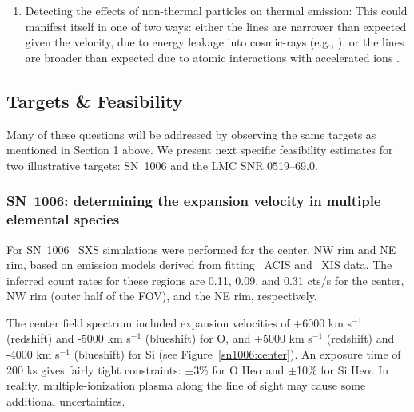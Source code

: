 \documentclass[11pt,a4paper]{article}
\begin{document}
{\begin{enumerate}
\item Detecting the effects of non-thermal particles on thermal
  emission: This could manifest itself in one of two ways: either the
  lines are narrower than expected given the velocity, due to energy
  leakage into cosmic-rays (e.g., \citealt{hughes00a, helder09}), or
  the lines are broader than expected due to atomic interactions with
  accelerated ions \citep{tatischeff98}.

\end{enumerate}


\subsection{Targets \& Feasibility}

Many of these questions will be addressed by observing
the same targets as mentioned in Section 1 above.
We present next specific feasibility estimates for two illustrative targets:
SN~1006 and the LMC SNR 0519--69.0. 

\subsubsection{SN~1006: determining the expansion velocity in multiple
elemental species} \label{subsec:sn1006}


For SN~1006 \ah\ SXS simulations were performed for the center, NW rim
and NE rim, based on emission models derived from fitting
\chandra\ ACIS and \suzaku\ XIS data.  The inferred count rates for
these regions are 0.11, 0.09, and 0.31 cts/s for the center, NW rim
(outer half of the FOV), and the NE rim, respectively.

The center field spectrum included expansion velocities of +6000 km
s$^{-1}$ (redshift) and -5000 km s$^{-1}$ (blueshift) for O, and
+5000 km s$^{-1}$ (redshift) and -4000 km s$^{-1}$ (blueshift) for Si
(see Figure~\ref{sn1006:center}). An exposure time of 200 ks gives
fairly tight constraints: $\pm$3\% for O He$\alpha$ and $\pm$10\% for
Si He$\alpha$.  In reality, multiple-ionization plasma along the line
of sight may cause some additional uncertainties.

}
\end{document}
